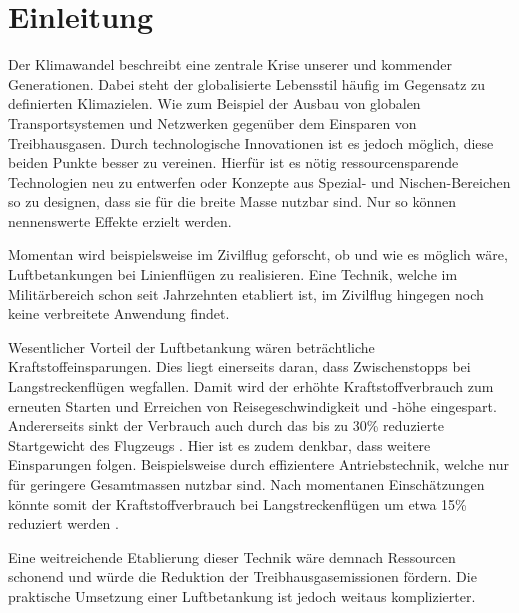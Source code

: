 \chapter{Einleitung}\label{chap:Einführung}

Der Klimawandel beschreibt eine zentrale Krise unserer und kommender Generationen. Dabei steht der globalisierte Lebensstil häufig im Gegensatz zu definierten Klimazielen. Wie zum Beispiel der Ausbau von globalen Transportsystemen und Netzwerken gegenüber dem Einsparen von Treibhausgasen. Durch technologische Innovationen ist es jedoch möglich, diese beiden Punkte besser zu vereinen. Hierfür ist es nötig ressourcensparende Technologien neu zu entwerfen oder Konzepte aus Spezial- und Nischen-Bereichen so zu designen, dass sie für die breite Masse nutzbar sind. Nur so können nennenswerte Effekte erzielt werden.

Momentan wird beispielsweise im Zivilflug geforscht, ob und wie es möglich wäre, Luftbetankungen bei Linienflügen zu realisieren. Eine Technik, welche im Militärbereich schon seit Jahrzehnten etabliert ist, im Zivilflug hingegen noch keine verbreitete Anwendung findet.

Wesentlicher Vorteil der Luftbetankung wären beträchtliche Kraftstoffeinsparungen.
Dies liegt einerseits daran, dass Zwischenstopps bei Langstreckenflügen wegfallen. Damit wird der erhöhte Kraftstoffverbrauch zum erneuten Starten und Erreichen von Reisegeschwindigkeit und -höhe eingespart.  
Andererseits sinkt der Verbrauch auch durch das bis zu 30\% reduzierte Startgewicht des Flugzeugs \cite{CEAS2015}. Hier ist es zudem denkbar, dass weitere Einsparungen folgen. Beispielsweise durch effizientere Antriebstechnik, welche nur für geringere Gesamtmassen nutzbar sind. 
Nach momentanen Einschätzungen könnte somit der Kraftstoffverbrauch bei Langstreckenflügen um etwa 15\% reduziert werden \cite{RefuelingTime}.

Eine weitreichende Etablierung dieser Technik wäre demnach Ressourcen schonend und würde die Reduktion der Treibhausgasemissionen fördern. Die praktische Umsetzung einer Luftbetankung ist jedoch weitaus komplizierter.
 

